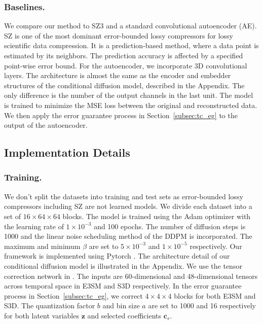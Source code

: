 \vspace{-0.2cm}
\subsubsection{Baselines.}
We compare our method to SZ3 \cite{SZ3} and a standard convolutional autoencoder (AE). SZ is one of the most dominant error-bounded lossy compressors for lossy scientific data compression. It is a prediction-based method, where a data point is estimated by its neighbors. The prediction accuracy is affected by a specified point-wise error bound. For the autoencoder, we incorporate 3D convolutional layers. The architecture is almost the same as the encoder and embedder structures of the conditional diffusion model, described in the Appendix. The only difference is the number of the output channels in the last unit. The model is trained to minimize the MSE loss between the original and reconstructed data. We then apply the error guarantee process in Section~\ref{subsec:tc_eg} to the output of the autoencoder.

\subsection{Implementation Details}
\subsubsection{Training.}
We don't split the datasets into training and test sets as error-bounded lossy compressors including SZ are not learned models. We divide each dataset into a set of $16\times 64\times 64$ blocks. The model is trained using the Adam optimizer \cite{adam} with the learning rate of $1\times 10^{-3}$ and 100 epochs. The number of diffusion steps is 1000 and the linear noise scheduling method of the DDPM is incorporated. The maximum and minimum $\beta$ are set to $5\times 10^{-3}$ and $1\times 10^{-5}$ respectively. Our framework is implemented using Pytorch \cite{pytorch}. The architecture detail of our conditional diffusion model is illustrated in the Appendix. We use the tensor correction network in \cite{JL-S3D_arxiv}. The inputs are 60-dimensional and 48-dimensional tensors across temporal space in E3SM and S3D respectively. In the error guarantee process in Section~\ref{subsec:tc_eg}, we correct $4\times 4\times 4$ blocks for both E3SM and S3D. The quantization factor $b$ and bin size $a$ are set to 1000 and 16 respectively for both latent variables $\boldsymbol{z}$ and selected coefficients $\boldsymbol{c}_s$.

